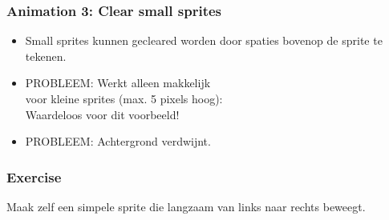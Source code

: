 \begin{frame}
\frametitle{Animation 3: Clear small sprites}

\begin{itemize}
  \item<1-> Small sprites kunnen gecleared worden door spaties bovenop de sprite te tekenen.
  \item<2-> PROBLEEM: Werkt alleen makkelijk\\
  			voor kleine sprites (max. 5 pixels hoog):\\
  			Waardeloos voor dit voorbeeld!
  \item<3-> PROBLEEM: Achtergrond verdwijnt.
\end{itemize}

\vspace{2.5cm}






\end{frame}




\begin{frame}
\frametitle{Exercise}


Maak zelf een simpele sprite die langzaam van links naar rechts beweegt.


\end{frame}





